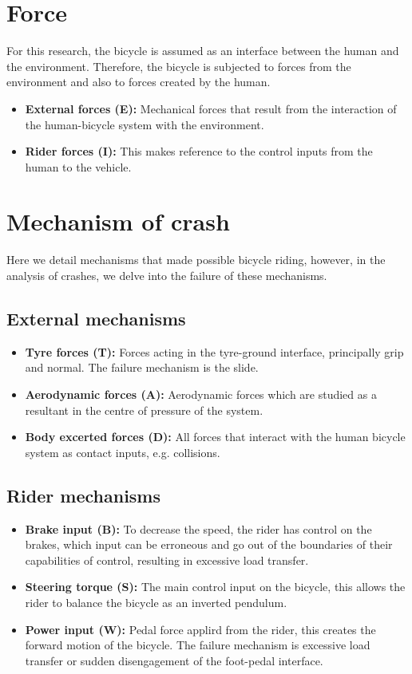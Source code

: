\documentclass{article}
\begin{document}
\section{Force}

For this research, the bicycle is assumed as an interface between the human and the environment.
%
Therefore, the bicycle is subjected to forces from the environment and also to forces created by the human.


\begin{itemize}
    \item \textbf{External forces (E):} Mechanical forces that result from the interaction of the human-bicycle system with the environment.
    \item \textbf{Rider forces (I):} This makes reference to the control inputs from the human to the vehicle.
\end{itemize}

\section{Mechanism of crash}

Here we detail mechanisms that made possible bicycle riding, however, in the analysis of crashes, we delve into the failure of these mechanisms.

\subsection{External mechanisms}
\begin{itemize}
    \item \textbf{Tyre forces (T):} Forces acting in the tyre-ground interface, principally grip and normal. The failure mechanism is the slide.
    \item \textbf{Aerodynamic forces (A):} Aerodynamic forces which are studied as a resultant in the centre of pressure of the system.
    \item \textbf{Body excerted forces (D):} All forces that interact with the human bicycle system as contact inputs, e.g. collisions.
\end{itemize}

\subsection{Rider mechanisms}
\begin{itemize}
    \item \textbf{Brake input (B):} To decrease the speed, the rider has control on the brakes, which input can be erroneous and go out of the boundaries of their capabilities of control, resulting in excessive load transfer.
    \item \textbf{Steering torque (S):} The main control input on the bicycle, this allows the rider to balance the bicycle as an inverted pendulum.
    \item \textbf{Power input (W):} Pedal force applird from the rider, this creates the forward motion of the bicycle.
        The failure mechanism is excessive load transfer or sudden disengagement of the foot-pedal interface.
\end{itemize}
\end{document}
